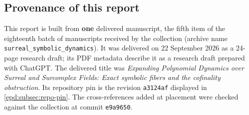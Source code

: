 \documentclass[11pt,a4paper]{article}
\numberwithin{equation}{section}
\theoremstyle{plain}
\theoremstyle{definition}
\theoremstyle{remark}
\begin{document}
\subsection{Provenance of this report}
\label{epd:subsec:provenance}
This report is built from \textbf{one} delivered manuscript, the fifth item
of the eighteenth batch of manuscripts received by the collection (archive
name \texttt{surreal\_symbolic\_dynamics}). It was delivered on
22 September 2026 as a 24-page research draft; its PDF metadata describe it
as a research draft prepared with ChatGPT. The delivered title was
\emph{Expanding Polynomial Dynamics over Surreal and Surcomplex Fields:
Exact symbolic fibers and the cofinality obstruction}. Its repository pin is
the revision \texttt{a3124af} displayed in
\cref{epd:subsec:repo-pin}. The cross-references added at placement were
checked against the collection at commit \texttt{e9a9650}.
\end{document}
